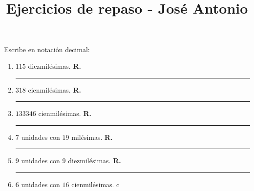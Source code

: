 

\title{Ejercicios de repaso - José Antonio \vspace{-2cm}}
\author{}
\date{ }

\renewcommand\thechoice{\Alph{choice})}
\newcommand\choicelabel{\thechoice}

\newenvironment{choices}%
  {\list{\choicelabel}%
     {\usecounter{choice}\def\makelabel##1{\hss\llap{##1}}%
       \settowidth{\leftmargin}{W.\hskip\labelsep\hskip 2.5em}%
       \def\choice{%
         \item
       } %
       \labelwidth\leftmargin\advance\labelwidth-\labelsep
       \topsep=0pt
       \partopsep=0pt
     }%
  }%
  {\endlist}

\newenvironment{oneparchoices}%
  {%
    \setcounter{choice}{0}%
    \def\choice{%
      \refstepcounter{choice}%
      \ifnum\value{choice}>1\relax
        \penalty -50\hskip 1em plus 1em\relax
      \fi
      \choicelabel
      \nobreak\enskip
    }%
    \ifvmode\else\enskip\fi
    \ignorespaces
  }%
  {}


\maketitle
\fontsize{14}{14}\selectfont

Escribe en notación decimal:
\begin{enumerate}[label=\alph*)]
\item $115$ diezmilésimas. \hspace{0.3cm} \textbf{R.} \rule{3cm}{0.1mm}
\item $318$ cienmilésimas. \hspace{0.3cm} \textbf{R.} \rule{3cm}{0.1mm}
\item $133346$ cienmilésimas. \hspace{0.3cm} \textbf{R.} \rule{3cm}{0.1mm}
\item $7$ unidades con $19$ milésimas. \hspace{0.3cm} \textbf{R.} \rule{3cm}{0.1mm}
\item $9$ unidades con $9$ diezmilésimas. \hspace{0.3cm} \textbf{R.} \rule{3cm}{0.1mm}
\item $6$ unidades con $16$ cienmilésimas. c
\end{enumerate}

